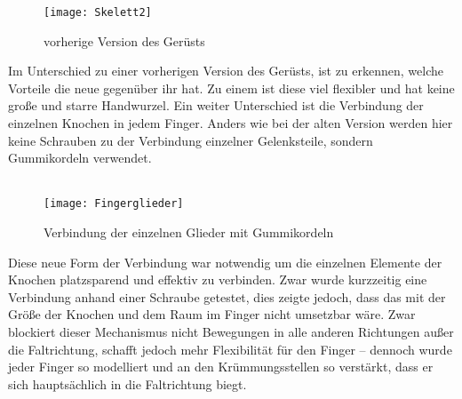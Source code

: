 \documentclass[titlepage,12pt,twoside]{article}
\begin{document}
\begin{figure}[H]
	\begin{center}
		\scalebox{0.8}
		{\texttt{[image: Skelett2]}}
		\caption{vorherige Version des Gerüsts}
		\label{fig:Skelett2}			
	\end{center}
\end{figure}
\hfill \break
Im Unterschied zu einer vorherigen Version des Gerüsts, ist zu erkennen, welche Vorteile die neue gegenüber ihr hat. Zu einem ist diese viel flexibler und hat keine große und starre Handwurzel. 
Ein weiter Unterschied ist die Verbindung der einzelnen Knochen in jedem Finger. Anders wie bei der alten Version werden hier keine Schrauben zu der Verbindung einzelner Gelenksteile, sondern Gummikordeln verwendet. \\
\\
\begin{figure}[H]
	\begin{center}
		\scalebox{0.5}
		{\texttt{[image: Fingerglieder]}}
		\caption{Verbindung der einzelnen Glieder mit Gummikordeln}
		\label{fig:Fingerglieder}			
	\end{center}
\end{figure}
\hfill \break
Diese neue Form der Verbindung war notwendig um die einzelnen Elemente der Knochen platzsparend und effektiv zu verbinden. Zwar wurde kurzzeitig eine Verbindung anhand einer Schraube getestet, dies zeigte jedoch, dass das mit der Größe der Knochen 
und dem Raum im Finger nicht umsetzbar wäre. Zwar blockiert dieser Mechanismus nicht Bewegungen in alle anderen Richtungen außer die Faltrichtung, schafft jedoch mehr Flexibilität für den Finger – dennoch wurde jeder Finger so modelliert und an den 
Krümmungsstellen so verstärkt, dass er sich hauptsächlich in die Faltrichtung biegt. \\
\\
\end{document}
